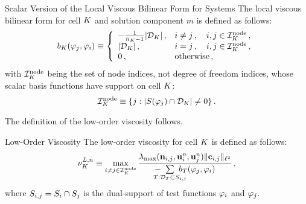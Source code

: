 \begin{definition}{Scalar Version of the Local Viscous Bilinear Form for Systems}
   The local viscous bilinear form for cell $K$ and solution component
   $m$ is defined as follows:
   \begin{equation}\label{eq:bilinearform_system}
     b_{K}(\varphi_j,\varphi_i)
       \equiv \left\{\begin{array}{l l}
         -\frac{1}{\bar{n}_K - 1}|\mathcal{D}_K|\,, & i\ne j\,,
       \quad i,j\in \mathcal{I}^{\text{node}}_K\,, \\
       |\mathcal{D}_K|\,, & i = j \,, \quad i,j\in \mathcal{I}^{\text{node}}_K\,, \\
       0          \,, & \mbox{otherwise}\,,
     \end{array}\right.
   \end{equation}
   with $\mathcal{I}^{\text{node}}_K$ being the set of node indices, not degree of
   freedom indices, whose scalar basis functions have support on cell $K$:
   \begin{equation}
     \mathcal{I}^{\text{node}}_K \equiv \{ j :
       |S(\varphi_j)\cap \mathcal{D}_K|\ne 0\}
     \,.
   \end{equation}
\end{definition}
The definition of the low-order viscosity follows.
\begin{definition}{Low-Order Viscosity}
   The low-order viscosity for cell $K$ is defined as follows:
   \begin{equation}
     \lowordercellviscosity[\timeindex] \equiv
       \max\limits_{i\ne j\in\indicesnode}
         \frac{\maxwavespeed(\normalvector_{i,j},\vectorsolution^\timeindex_i,
           \vectorsolution^\timeindex_j)\|\gradiententry\|_{\ell^2}}
         {-\mkern-20mu\sumKSij[T]\mkern-20mu\localviscbilinearform{T}{j}{i}}
     \eqc
   \end{equation}
   where $S_{i,j}=S_i\cap S_j$ is the dual-support of test
   functions $\varphi_i$ and $\varphi_j$.
\end{definition}
